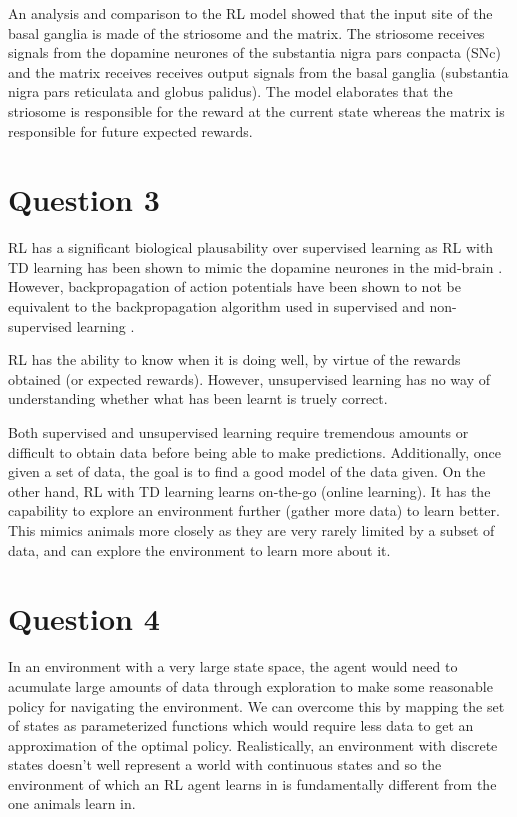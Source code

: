 \documentclass[10pt, a4paper]{article}
\begin{document}
An analysis and comparison to the RL model \cite{berns1998computational} \cite{dayan2002reward} showed that the input site of the basal ganglia is made of the striosome and the matrix. The striosome receives signals from the dopamine neurones of the substantia nigra pars conpacta (SNc) and the matrix receives receives output signals from the basal ganglia (substantia nigra pars reticulata and globus palidus). The model elaborates that the striosome is responsible for the reward at the current state whereas the matrix is responsible for future expected rewards.


\section*{Question 3}

RL has a significant biological plausability over supervised learning as RL with TD learning has been shown to mimic the dopamine neurones in the mid-brain \cite{doya2000complementary}. However, backpropagation of action potentials have been shown to not be equivalent to the backpropagation algorithm used in supervised and non-supervised learning \cite{stuart1997action}. 

RL has the ability to know when it is doing well, by virtue of the rewards obtained (or expected rewards). However, unsupervised learning has no way of understanding whether what has been learnt is truely correct. 

Both supervised and unsupervised learning require tremendous amounts or difficult to obtain data before being able to make predictions. Additionally, once given a set of data, the goal is to find a good model of the data given. On the other hand, RL with TD learning learns on-the-go (online learning). It has the capability to explore an environment further (gather more data) to learn better. This mimics animals more closely as they are very rarely limited by a subset of data, and can explore the environment to learn more about it.

\section*{Question 4}

In an environment with a very large state space, the agent would need to acumulate large amounts of data through exploration to make some reasonable policy for navigating the environment. We can overcome this by mapping the set of states as parameterized functions \cite[Chapter 10]{sutton1998introduction} which would require less data to get an approximation of the optimal policy. Realistically, an environment with discrete states doesn't well represent a world with continuous states and so the environment of which an RL agent learns in is fundamentally different from the one animals learn in. 
\end{document}
